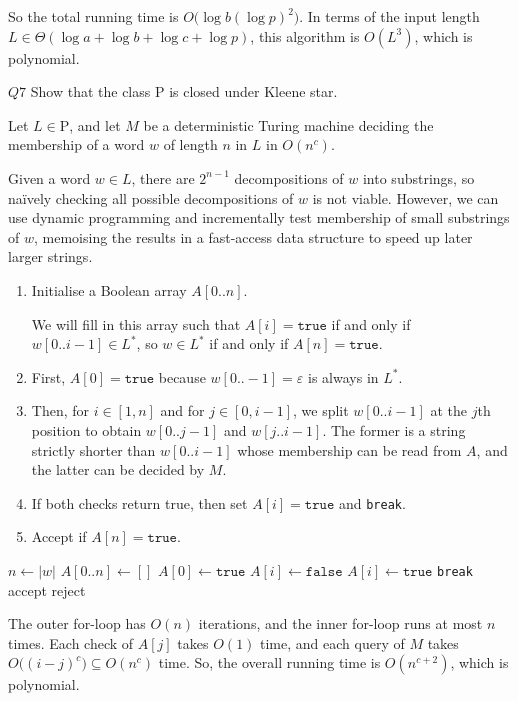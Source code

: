 \documentclass{article}
\theoremstyle{definition}
\theoremstyle{definition}
\theoremstyle{remark}
\begin{document}
So the total running time is $O\bigl(\log{b}(\log{p})^2\bigr)$. In terms of the input length $L\in\Theta(\log a+\log b+\log c+\log p)$, this algorithm is $O(L^3)$, which is polynomial.









\begin{questionbox}{$Q7$}
    Show that the class $\mathrm{P}$ is closed under Kleene star.
\end{questionbox}

\bigskip

Let $L\in\mathrm{P}$, and let $M$ be a deterministic Turing machine deciding the membership of a word $w$ of length $n$ in $L$ in $O(n^c)$.

Given a word $w\in L$, there are $2^{n-1}$ decompositions of $w$ into substrings, so naïvely checking all possible decompositions of $w$ is not viable. However, we can use dynamic programming and incrementally test membership of small substrings of $w$, memoising the results in a fast-access data structure to speed up later larger strings.

\begin{enumerate}
    \item[$(1)$] Initialise a Boolean array $A[0..n]$.
    
    We will fill in this array such that $A[i]=\mathtt{true}$ if and only if $w[0..i-1]\in L^\ast$, so $w\in L^\ast$ if and only if $A[n]=\mathtt{true}$.
    
    \item[$(2)$] First, $A[0]=\mathtt{true}$ because $w[0..-1]=\varepsilon$ is always in $L^\ast$.

    \item[$(3)$] Then, for $i\in[1,n]$ and for $j\in[0,i-1]$, we split $w[0..i-1]$ at the $j$th position to obtain $w[0..j-1]$ and $w[j..i-1]$. The former is a string strictly shorter than $w[0..i-1]$ whose membership can be read from $A$, and the latter can be decided by $M$.

    \item[$(4)$] If both checks return true, then set $A[i]=\mathtt{true}$ and \texttt{break}.

    \item[$(5)$] Accept if $A[n]=\mathtt{true}$.
\end{enumerate}

\begin{algorithm}[H]
\caption{Decide Kleene star}
\begin{algorithmic}[1]
    \State $n\gets|w|$
    \State $A[0..n]\gets[]$
    \State $A[0]\gets\texttt{true}$
        \State $A[i]\gets\mathtt{false}$
                \State $A[i]\gets\mathtt{true}$
                \State \texttt{break}
            \EndIf
        \EndFor
    \EndFor
        \State \Return accept
    \Else
        \State \Return reject
    \EndIf
\EndProcedure
\end{algorithmic}
\end{algorithm}


The outer for-loop has $O(n)$ iterations, and the inner for-loop runs at most $n$ times. Each check of $A[j]$ takes $O(1)$ time, and each query of $M$ takes $O\bigl((i-j)^c\bigr)\subseteq O(n^c)$ time. So, the overall running time is $O(n^{c+2})$, which is polynomial.
\end{document}
